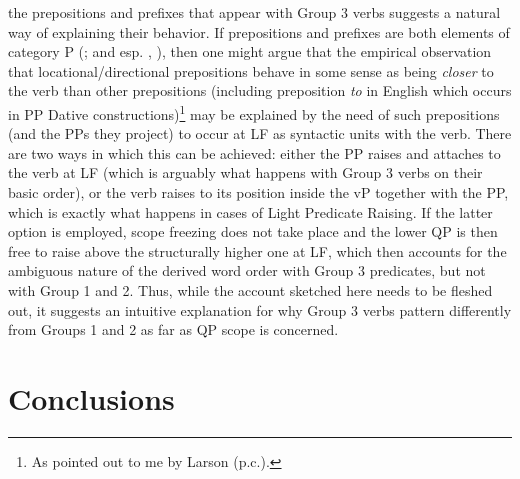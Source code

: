\documentclass[output=paper,colorlinks,citecolor=brown,nonflat]{./langscibook}
\begin{document}
the prepositions and prefixes that appear with Group 3 verbs suggests a natural way of explaining their behavior. If prepositions and prefixes are both elements of category P (\citealt{Matushansky2002, Biskup2017}; and esp. \citealt{Svenonius2004Slavic}, \citeyear{Svenonius2008}), then one might argue that the empirical observation that locational/directional prepositions behave in some sense as being \textit{closer} to the verb than other prepositions (including preposition \textit{to} in English which occurs in PP Dative constructions)\footnote{As pointed out to me by Larson (p.c.).} may be explained by the need of such prepositions (and the PPs they project) to occur at LF as syntactic units with the verb. There are two ways in which this can be achieved: either the PP raises and attaches to the verb at LF (which is arguably what happens with Group 3 verbs on their basic order), or the verb raises to its position inside the vP together with the PP, which is exactly what happens in cases of Light Predicate Raising. If the latter option is employed, scope freezing does not take place and the lower QP is then free to raise above the structurally higher one at LF, which then accounts for the ambiguous nature of the derived word order with Group 3 predicates, but not with Group 1 and 2. Thus, while the account sketched here needs to be fleshed out, it suggests an intuitive explanation for why Group 3 verbs pattern differently from Groups 1 and 2 as far as QP scope is concerned.

\section{Conclusions}\label{sec:antonyuk:5}
\end{document}
